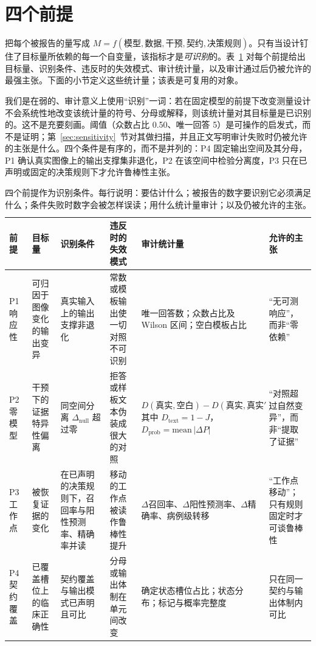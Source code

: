 \section{四个前提}
\label{sec:preconditions}

把每个被报告的量写成 $M=f(\text{模型},\text{数据},\text{干预},\text{契约},\text{决策规则})$。只有当设计钉住了目标量所依赖的每一个自变量，该指标才是\emph{可识别}的。表~\ref{tab:framework} 对每个前提给出目标量、识别条件、违反时的失效模式、审计统计量，以及审计通过后仍被允许的最强主张。下面的小节定义这些统计量；该表是可复用的对象。

我们是在弱的、审计意义上使用``识别''一词：若在固定模型的前提下改变测量设计不会系统性地改变该统计量的符号、分母或解释，则该统计量对其目标量是已识别的。这不是充要刻画。阈值（众数占比 0.50、唯一回答 5）是可操作的启发式，而不是证明；第~\ref{sec:sensitivity}~节对其做扫描，并且正文写明审计失败时仍被允许的主张是什么。四个条件是有序的，而不是并列的：P4 固定输出空间及其分母，P1 确认真实图像上的输出支撑集非退化，P2 在该空间中检验分离度，P3 只在已声明或固定的决策规则下才允许鲁棒性主张。

\begin{table}[H]
\centering
\footnotesize
\setlength{\tabcolsep}{3pt}
\begingroup{}
\caption{四个前提作为识别条件。每行说明：要估计什么；被报告的数字要识别它必须满足什么；条件失败时数字会被怎样误读；用什么统计量审计；以及仍被允许的主张。}
\label{tab:framework}
\begin{tabular}{@{}>{\raggedright\arraybackslash}p{}>{\raggedright\arraybackslash}p{}>{\raggedright\arraybackslash}p{}>{\raggedright\arraybackslash}p{}>{\raggedright\arraybackslash}p{}>{\raggedright\arraybackslash}p{}@{}}
\toprule
前提 & 目标量 & 识别条件 & 违反时的失效模式 & 审计统计量 & 允许的主张 \\
\midrule
P1 响应性 & 可归因于图像变化的输出变异 & 真实输入上的输出支撑非退化 & 常数或模板输出使一切对照不可识别 & 唯一回答数；众数占比及 Wilson 区间；空白模板占比 & ``无可测响应''，而非``零依赖'' \\
P2 零模型 & 干预下的证据特异性偏离 & 同空间分离 $\Delta_{\text{null}}$ 超过零 & 拒答或样板文本伪装成很大的对照 & $D(\text{真实},\text{空白}) - D(\text{真实},\text{真实}')$\newline 其中 $D_{\text{text}}=1-J$，$D_{\text{prob}}=\text{mean}\,|\Delta P|$ & ``对照超过自然变异''，而非``提取了证据'' \\
P3 工作点 & 被恢复证据的变化 & 在已声明的决策规则下，召回率与阳性预测率、精确率并读 & 移动的工作点被读作鲁棒性提升 & $\Delta$召回率、$\Delta$阳性预测率、$\Delta$精确率、病例级转移 & ``工作点移动''；只有规则固定时才可谈鲁棒性 \\
P4 契约覆盖 & 已覆盖槽位上的临床正确性 & 契约覆盖与输出模式已声明且可比 & 分母或输出体制在单元间改变 & 确定状态槽位占比；状态分布；标记与概率完整度 & 只在同一契约与输出体制内可比 \\
\bottomrule
\end{tabular}
\endgroup
\end{table}

